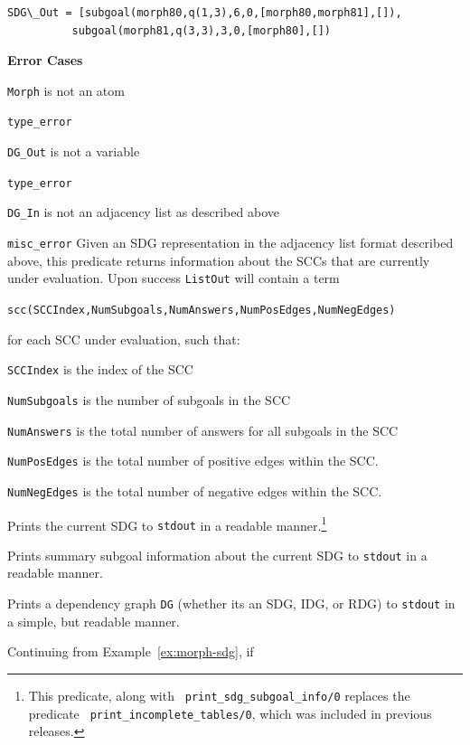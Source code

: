 \begin{description}
\begin{example}
\begin{verbatim}
SDG\_Out = [subgoal(morph80,q(1,3),6,0,[morph80,morph81],[]),
          subgoal(morph81,q(3,3),3,0,[morph80],[])
\end{verbatim}
\end{example}

{\bf Error Cases} 
\bi
\item 	{\tt Morph} is not an atom
\bi
\item 	{\tt type\_error}
\ei
%
\item 	{\tt DG\_Out} is not a variable
\bi
\item 	{\tt type\_error}
\ei
%
\item 	{\tt DG\_In} is not an adjacency list as described above
\bi
\item 	{\tt misc\_error}
\ei
\ei
%
%
Given an SDG representation in the adjacency list format described
above, this predicate returns information about the SCCs that are
currently under evaluation.  Upon success {\tt ListOut} will contain a
term

{\tt scc(SCCIndex,NumSubgoals,NumAnswers,NumPosEdges,NumNegEdges)}

for each SCC under evaluation, such that:

\bi
\item {\tt SCCIndex} is the index of the SCC
\item {\tt NumSubgoals} is the number of subgoals in the SCC
\item {\tt NumAnswers} is the total number of answers for all subgoals in the SCC
\item {\tt NumPosEdges} is the total number of positive edges within the SCC.
\item {\tt NumNegEdges} is the total number of negative edges within the SCC.
  \ei

%
Prints the current SDG to {\tt stdout} in a readable
manner.\footnote{This predicate, along with {\tt
    print\_sdg\_subgoal\_info/0} replaces the predicate {\tt
    print\_incomplete\_tables/0}, which was included in previous
  releases.}

%
Prints summary subgoal information about the current SDG to {\tt stdout} in a
readable manner.

%
Prints a dependency graph {\tt DG} (whether its an SDG, IDG, or RDG)
to {\tt stdout} in a simple, but readable manner.
%
\begin{example}
Continuing from Example~\ref{ex:morph-sdg}, if 


\end{example}
\end{description}
